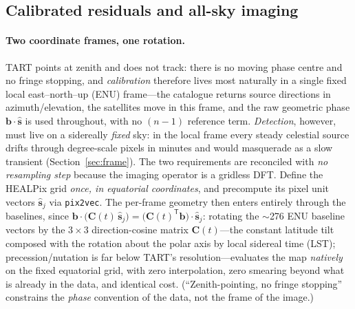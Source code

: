 \documentclass[11pt]{article}
\newcommand{\T}{^{\mathsf{T}}}
\begin{document}
\subsection{Calibrated residuals and all-sky imaging}
\label{sec:imaging}

\paragraph{Two coordinate frames, one rotation.} TART points at zenith and does not
track: there is no moving phase centre and no fringe stopping, and \emph{calibration} therefore
lives most naturally in a single fixed local east--north--up (ENU) frame---the catalogue returns
source directions in azimuth/elevation, the satellites move in this frame, and the raw geometric
phase $\bm{b}\cdot\hat{\bm{s}}$ is used throughout, with no $(n-1)$ reference term. \emph{Detection},
however, must live on a sidereally \emph{fixed} sky: in the local frame every steady celestial
source drifts through degree-scale pixels in minutes and would masquerade as a slow transient
(Section~\ref{sec:frame}). The two requirements are reconciled with \emph{no resampling step}
because the imaging operator is a gridless DFT. Define the HEALPix grid \emph{once, in equatorial
coordinates}, and precompute its pixel unit vectors $\hat{\bm{s}}_j$ via \texttt{pix2vec}. The
per-frame geometry then enters entirely through the baselines, since
$\bm{b}\cdot\big(\bm{C}(t)\,\hat{\bm{s}}_j\big)=\big(\bm{C}(t)\T\bm{b}\big)\cdot\hat{\bm{s}}_j$:
rotating the $\sim$276 ENU baseline vectors by the $3\times3$ direction-cosine matrix
$\bm{C}(t)$---the constant latitude tilt composed with the rotation about the polar axis by local
sidereal time (LST); precession/nutation is far below TART's resolution---evaluates the map
\emph{natively} on the fixed equatorial grid, with zero interpolation, zero smearing beyond what is
already in the data, and identical cost. (``Zenith-pointing, no fringe stopping'' constrains the
\emph{phase} convention of the data, not the frame of the image.)
\end{document}
